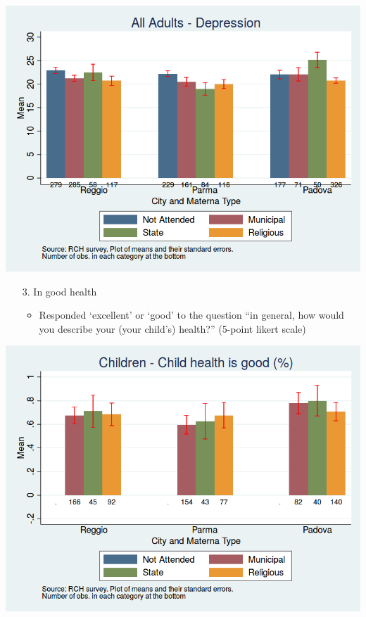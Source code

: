 \documentclass{beamer}
\begin{document}
\begin{frame}
\center
\includegraphics[scale=0.40]{../Output/Depression_score_AllAdults.png}
\end{frame}

\begin{frame}
\begin{itemize}
	\centering
	\item[3.] In good health
	\begin{itemize}
		\centering
		\item Responded `excellent' or `good' to the question ``in general, how would you describe your (your child's) health?'' (5-point likert scale)
	\end{itemize}
\end{itemize}
\end{frame}

\begin{frame}
\center
\includegraphics[scale=0.40]{../Output/childHealthPerc_Child.png}
\end{frame}
\end{document}
